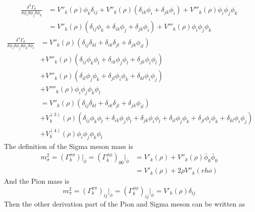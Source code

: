 \documentclass[UTF8]{article}
\begin{document}
\begin{equation}
\begin{split}
\frac{\delta^3\Gamma_k}{\delta\phi_i\delta\phi_j\delta\phi_k}&=V''_k(\rho)\phi_k\delta_{ij}+V''_k(\rho)(\delta_{ik}\phi_i+\delta_{jk}\phi_i)+V'''_k(\rho)\phi_i\phi_j\phi_k\\
&=V''_k(\rho)(\delta_{ij}\phi_k+\delta_{ik}\phi_j+\delta_{jk}\phi_i)+V'''_k(\rho)\phi_i\phi_j\phi_k
\end{split}
\end{equation}
\begin{equation}
\begin{split}
\frac{\delta^4\Gamma_k}{\delta\phi_i\delta\phi_j\delta\phi_k\delta\phi_l}&=V''_k(\rho)(\delta_{ij}\delta_{kl}+\delta_{ik}\delta_{jl}+\delta_{jk}\phi_{il})\\
&+V'''_k(\rho)(\delta_{ij}\phi_k\phi_l+\delta_{ik}\phi_j\phi_l+\delta_{jk}\phi_i\phi_l)\\
&+V'''_k(\rho)(\delta_{il}\phi_j\phi_k+\delta_{jl}\phi_i\phi_k+\delta_{kl}\phi_i\phi_j)\\
&+V''''_k(\rho)\phi_i\phi_j\phi_k\phi_l\\
&=V''_k(\rho)(\delta_{ij}\delta_{kl}+\delta_{ik}\delta_{jl}+\delta_{jk}\phi_{il})\\
&+V^{(3)}_{k}(\rho)(\delta_{ij}\phi_k\phi_l+\delta_{ik}\phi_j\phi_l+\delta_{jk}\phi_i\phi_l+\delta_{il}\phi_j\phi_k+\delta_{jl}\phi_i\phi_k+\delta_{kl}\phi_i\phi_j)\\
&+V^{(4)}_{k}(\rho)\phi_i\phi_j\phi_k\phi_l
\end{split}
\end{equation}
The definition of the Sigma meson mass is
\begin{equation}
\begin{split}
m^2_{\sigma}=(\Gamma^{\sigma\sigma}_k)\big|_{\bar{\phi}}=(\Gamma^{\phi\phi}_k)_{00}\big|_{\bar{\phi}}&=V'_k(\rho)+V''_k(\rho)\bar{\phi}_0\bar{\phi}_0\\
&=V'_k(\rho)+2\rho V''_k(rho)
\end{split}
\end{equation}
And the Pion mass is
\begin{equation}
m^2_{\pi}=(\Gamma^{\pi\pi}_k)_{ij}\big|_{\bar{\phi}}=(\Gamma^{\phi\phi}_k)_{ij}\big|_{\bar{\phi}}=V'_k(\rho)\delta_{ij}
\end{equation}
Then the other derivation part of the Pion and Sigma meson can be written as
\end{document}
